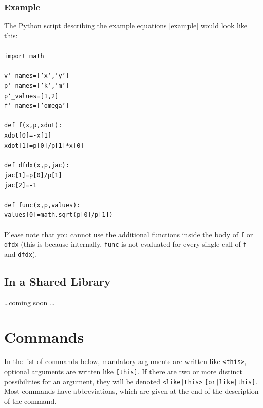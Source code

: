 \documentclass[10pt,a4paper,titlepage]{article}
\newcommand{\T}[1]{\texttt{#1}}
\begin{document}
\subsubsection*{Example}
The Python script describing the example equations \eqref{example} would look like this:\\
\\
\T{import math}\\
\\
\T{v\char`_names=['x','y']}\\
\T{p\char`_names=['k','m']}\\
\T{p\char`_values=[1,2]}\\
\T{f\char`_names=['omega']}\\
\\
\T{def f(x,p,xdot):}\\
\hphantom{mmm}\T{xdot[0]=-x[1]}\\
\hphantom{mmm}\T{xdot[1]=p[0]/p[1]*x[0]}\\
\\
\T{def dfdx(x,p,jac):}\\
\hphantom{mmm}\T{jac[1]=p[0]/p[1]}\\
\hphantom{mmm}\T{jac[2]=-1}\\
\\
\T{def func(x,p,values):}\\
\hphantom{mmm}\T{values[0]=math.sqrt(p[0]/p[1])}\\
\\
Please note that you cannot use the additional functions inside the body of \T{f} or \T{dfdx} (this is because internally, \T{func} is not evaluated for every single call of \T{f} and \T{dfdx}). 
\subsection{In a Shared Library}
\ldots coming soon \ldots

\newpage\section{Commands}
\label{sec::comm}
In the list of commands below, mandatory arguments are written like \T{<this>}, optional arguments are written like \T{[this]}. If there are two or more distinct possibilities for an argument, they will be denoted \T{<like|this>} \T{[or|like|this]}. Most commands have abbreviations, which are given at the end of the description of the command.
\end{document}
